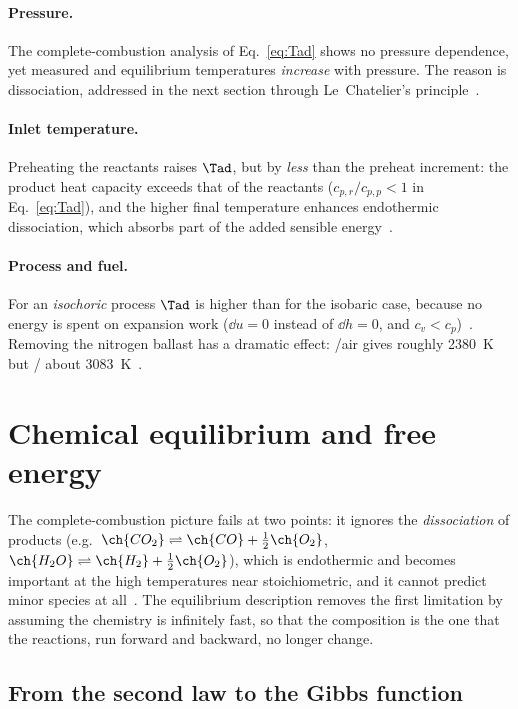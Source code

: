 \paragraph{Pressure.} The complete-combustion analysis of Eq.~\eqref{eq:Tad} shows no pressure dependence, yet measured and equilibrium temperatures \emph{increase} with pressure. The reason is dissociation, addressed in the next section through Le~Chatelier's principle~\cite{lecture2}.

\paragraph{Inlet temperature.} Preheating the reactants raises $\Tad$, but by \emph{less} than the preheat increment: the product heat capacity exceeds that of the reactants ($c_{p,r}/c_{p,p}<1$ in Eq.~\eqref{eq:Tad}), and the higher final temperature enhances endothermic dissociation, which absorbs part of the added sensible energy~\cite{lecture2,transcript_tutorial}.

\paragraph{Process and fuel.} For an \emph{isochoric} process $\Tad$ is higher than for the isobaric case, because no energy is spent on expansion work ($\dd u=0$ instead of $\dd h=0$, and $c_v<c_p$)~\cite{lecture1}. Removing the nitrogen ballast has a dramatic effect: /air gives roughly \SI{2380}{K} but / about \SI{3083}{K}~\cite{maas_combustion_lecture}.

\section{Chemical equilibrium and free energy}

The complete-combustion picture fails at two points: it ignores the \emph{dissociation} of products (e.g.\ $\ch{CO_2}\rightleftharpoons\ch{CO}+\tfrac12\ch{O_2}$, $\ch{H_2O}\rightleftharpoons\ch{H_2}+\tfrac12\ch{O_2}$), which is endothermic and becomes important at the high temperatures near stoichiometric, and it cannot predict minor species at all~\cite{lecture2}. The equilibrium description removes the first limitation by assuming the chemistry is infinitely fast, so that the composition is the one that the reactions, run forward and backward, no longer change.

\subsection{From the second law to the Gibbs function}

